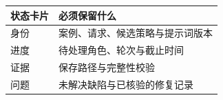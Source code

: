 \begin{tabular}{@{}P{4.0cm}P{8.5cm}@{}}
\toprule
\textbf{状态卡片} & \textbf{必须保留什么} \\
\midrule
身份 & 案例、请求、候选策略与提示词版本 \\
进度 & 待处理角色、轮次与截止时间 \\
证据 & 保存路径与完整性校验 \\
问题 & 未解决缺陷与已核验的修复记录 \\
\bottomrule
\end{tabular}
